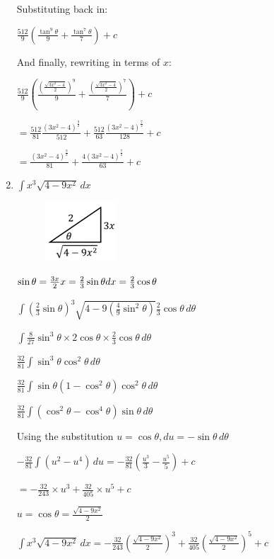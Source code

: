 \documentclass[../main.tex]{subfiles}
\begin{document}
\begin{enumerate}
    Substituting back in:

    \(\frac{512}{9}(\frac{\tan^9{\theta}}{9}+\frac{\tan^7{\theta}}{7})+c\)

    And finally, rewriting in terms of $x$:

    \(\frac{512}{9}(\frac{(\frac{\sqrt{3x^2-4}}{2})^9}{9}+\frac{(\frac{\sqrt{3x^2-4}}{2})^7}{7})+c\)

    \(=\frac{512}{81}\frac{(3x^2-4)^\frac{9}{2}}{512}+\frac{512}{63}\frac{(3x^2-4)^\frac{7}{2}}{128}+c\)

    \(=\frac{(3x^2-4)^\frac{9}{2}}{81}+\frac{4(3x^2-4)^\frac{7}{2}}{63}+c\)

    \item 
    \(\int x^3\sqrt{4-9x^2}\,dx\)

    \begin{figure}[h]
        \includegraphics{images/trigsuba7.png}
    \end{figure}

    \(\sin{\theta}=\frac{3x}{2}\\
    x=\frac{2}{3}\sin{\theta}\\
    dx=\frac{2}{3}\cos{\theta}\)

    \(\int (\frac{2}{3}\sin{\theta})^3\sqrt{4-9(\frac{4}{9}\sin^2{\theta})}\frac{2}{3}\cos{\theta}\,d\theta\)

    \(\int \frac{8}{27}\sin^3{\theta}\times 2\cos{\theta}\times \frac{2}{3}\cos{\theta}\,d\theta\)

    \(\frac{32}{81}\int \sin^3{\theta}\cos^2{\theta}\,d\theta\)

    \(\frac{32}{81}\int \sin{\theta}(1-\cos^2{\theta})\cos^2{\theta}\,d\theta\)

    \(\frac{32}{81}\int (\cos^2{\theta}-\cos^4{\theta})\sin{\theta}\,d\theta\)

    Using the substitution \(u=\cos{\theta}, du=-\sin{\theta}\,d\theta\)

    \(-\frac{32}{81}\int (u^2-u^4)\,du=-\frac{32}{81}(\frac{u^3}{3}-\frac{u^5}{5})+c\)

    \(=-\frac{32}{243}\times u^3+\frac{32}{405}\times u^5+c\)

    \(u=\cos{\theta}=\frac{\sqrt{4-9x^2}}{2}\)

    \(\int x^3\sqrt{4-9x^2}\,dx=-\frac{32}{243}(\frac{\sqrt{4-9x^2}}{2})^3+\frac{32}{405}(\frac{\sqrt{4-9x^2}}{2})^5+c\)


\end{enumerate}
\end{document}
